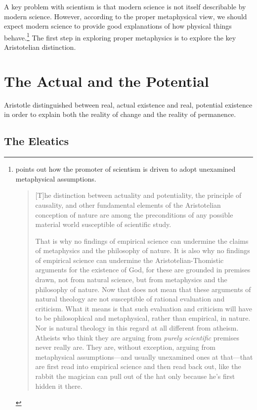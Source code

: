 \documentclass[twocolumn]{article}
\begin{document}
A key problem with scientism is that modern science is not itself describable
by modern science.  However, according to the proper metaphysical view, we
should expect modern science to provide good explanations of how physical
things behave.\footnote{%
   \cite{f2012} points out how the promoter of scientism is driven to
   adopt unexamined metaphysical assumptions.
   \begin{quote}
      [T]he distinction between actuality and potentiality, the principle of
      causality, and other fundamental elements of the Aristotelian conception
      of nature are among the preconditions of any possible material world
      susceptible of scientific study.

      That is why no findings of empirical science can undermine the claims of
      metaphysics and the philosophy of nature.  It is also why no findings of
      empirical science can undermine the Aristotelian-Thomistic arguments for
      the existence of God, for these are grounded in premises drawn, not from
      natural science, but from metaphysics and the philosophy of nature.  Now
      that does not mean that these arguments of natural theology are not
      susceptible of rational evaluation and criticism.  What it means is that
      such evaluation and criticism will have to be philosophical and
      metaphysical, rather than empirical, in nature.  Nor is natural theology
      in this regard at all different from atheism.  Atheists who think they
      are arguing from \emph{purely scientific} premises never really are.
      They are, without exception, arguing from metaphysical assumptions---and
      usually unexamined ones at that---that are first read into empirical
      science and then read back out, like the rabbit the magician can pull out
      of the hat only because he's first hidden it there.
   \end{quote}%
}
The first step in exploring proper metaphysics is to explore the key
Aristotelian distinction.

\section{The Actual and the Potential}

Aristotle distinguished between real, actual existence and real, potential
existence in order to explain both the reality of change and the reality of
permanence.

\subsection{The Eleatics}
\end{document}
